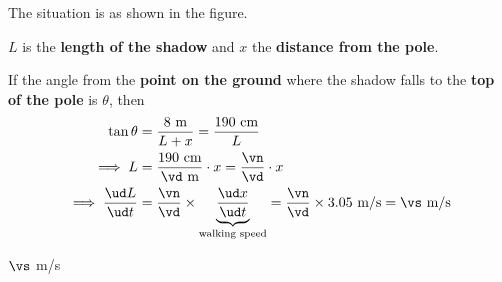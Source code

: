 \DIVIDE{}\vn
\SUBTRACT\vp\vn\vd
\EXPR[2]\vs{(\vn/\vd)*\vw}

\begin{solution}[\halfpage]
  The situation is as shown in the figure. 
  
  $L$ is the \textbf{length of the shadow} and 
  $x$ the \textbf{distance from the pole}. 

  If the angle from the \textbf{point on the ground} where the shadow falls to 
  the \textbf{top of the pole} is $\theta$, then 
  \begin{align}
      \tan\theta &= \dfrac{\vp\text{ m}}{L+x} = \dfrac{\vm\text{ cm}}{L} \\
      \implies L &= \dfrac{\vm\text{ cm}}{\vd\text{ m}}\cdot x = \dfrac\vn\vd\cdot x \\
      \implies \dfrac{\ud L}{\ud t} &= \dfrac\vn\vd\times\underbrace{\dfrac{\ud x}{\ud t}}_{\text{walking speed}}
      = \dfrac\vn\vd\times \vw\text{ m/s} = \vs\text{ m/s}
  \end{align}
\end{solution}

\ifprintanswers\begin{codex}$\vs$ m/s\end{codex}\fi
